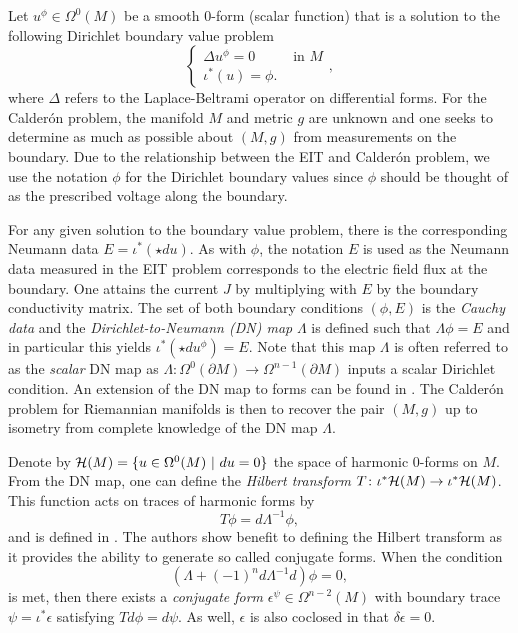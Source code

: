 Let $u^\phi \in \Omega^0(M)$ be a smooth 0-form (scalar function) that is a solution to the following Dirichlet boundary value problem
\begin{equation}
\label{eq:dirichlet_problem}
\begin{cases} \Delta u^\phi = 0 & \textrm{ in $M$} \\  \iota^*( u) = \phi. \end{cases},
\end{equation}
where $\Delta$ refers to the Laplace-Beltrami operator on differential forms. For the Calder\'on problem, the manifold $M$ and metric $g$ are unknown and one seeks to determine as much as possible about $(M,g)$ from measurements on the boundary.  Due to the relationship between the EIT and Calder\'on problem, we use the notation $\phi$ for the Dirichlet boundary values since $\phi$ should be thought of as the prescribed voltage along the boundary. 

For any given solution to the boundary value problem, there is the corresponding Neumann data $E=\iota^*(\star d u)$.  As with $\phi$, the notation $E$ is used as the Neumann data measured in the EIT problem corresponds to the electric field flux at the boundary. One attains the current $J$ by multiplying with $E$ by the boundary conductivity matrix. The set of both boundary conditions $(\phi, E)$ is the \emph{Cauchy data} and the \emph{Dirichlet-to-Neumann (DN) map} $\Lambda$ is defined such that $\Lambda \phi = E$ and in particular this yields $\iota^*(\star d u^\phi)= E$. Note that this map $\Lambda$ is often referred to as the \emph{scalar} DN map as $\Lambda \colon \Omega^0(\partial M) \to \Omega^{n-1}(\partial M)$ inputs a scalar Dirichlet condition. An extension of the DN map to forms can be found in \cite{belishev_dirichlet_2008,sharafutdinov_complete_2013}. The Calder\'on problem for Riemannian manifolds is then to recover the pair $(M,g)$ up to isometry from complete knowledge of the DN map $\Lambda$. 

Denote by $\mathcal{H}(M) = \{u \in \Omega^0(M) ~\vert~ du=0\}$ the space of harmonic 0-forms on $M$.  From the DN map, one can define the \emph{Hilbert transform} $T\colon \iota^* \mathcal{H}(M) \to \iota^* \mathcal{H}(M)$.  This function acts on traces of harmonic forms by
\[
T \phi  = d\Lambda^{-1} \phi,
\]
and is defined in \cite{belishev_dirichlet_2008}. The authors show benefit to defining the Hilbert transform as it provides the ability to generate so called conjugate forms.  When the condition
\begin{equation}
\label{eq:conjugate_requirement}
\left( \Lambda + (-1)^{n}d\Lambda^{-1}d\right)\phi = 0, 
\end{equation}
is met, then there exists a \emph{conjugate form} $\epsilon^\psi \in \Omega^{n-2}(M)$ with boundary trace $\psi = \iota^* \epsilon$ satisfying $Td\phi = d \psi$. As well, $\epsilon$ is also coclosed in that $\delta \epsilon=0$. 


